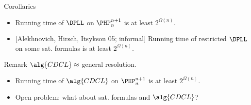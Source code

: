 \begin{frame}{Corollaries}

    \begin{itemize}
        \item{} Running time of $\DPLL$ on $\PHP_{n}^{n + 1}$ is at least $2^{\Omega(n)}$.
            \pause
        \item{} [Alekhnovich, Hirsch, Itsykson 05; \alert{informal}] Running time of \alert{restricted}
            $\DPLL$ on some \alert{sat. formulas} is at least $2^{\Omega(n)}$. 
    \end{itemize}

    \pause
    \vspace{0.5cm}
    \begin{block}{Remark}
        $\alg{CDCL} \approx$ general resolution.
    \end{block}

    \pause
    \begin{itemize}
        \item{} Running time of $\alg{CDCL}$ on $\PHP_{n}^{n + 1}$ is at least $2^{\Omega(n)}$.
        \item{} \alert{Open problem}: what about sat. formulas and $\alg{CDCL}$?
    \end{itemize}

\end{frame}
